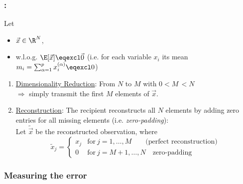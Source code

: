 \begin{frame}\frametitle{\subsecname:~\subsubsecname}

Let
\slidesonly{\vspace{-5mm}}
\begin{itemize}
\item[]$\vec x \in \R^N$,\\
\item[] w.l.o.g. $\E[\vec x] \eqexcl \vec 0$ \notesonly{\\

}(i.e. for each variable $x_i$ its mean $m_i = \sum_{\alpha=1}^{p} x_i^{(\alpha)} \eqexcl 0$)
\end{itemize}

\pause

\begin{enumerate}
\item \underline{Dimensionality Reduction}: From $N$ to $M$ with $0 < M\, < N$\\
$\Rightarrow$ simply transmit the first $M$ elements of $\vec x$. 
\pause
\item \underline{Reconstruction}: The recipient reconstructs all $N$ elements by adding zero entries for all missing elements (i.e. \textit{zero-padding}):\\
Let $\widetilde{\vec{x}}$ be the reconstructed observation, where\\ 
 
 \begin{equation}
 \widetilde{x}_j = \begin{cases} 
      {x}_j & \text{for}~j=1,\ldots,M \qquad \text{(perfect reconstruction)} \\
      0 & \text{for}~j=M+1,\ldots,N \quad \text{zero-padding} 
   \end{cases}
 \end{equation}
\end{enumerate}


\end{frame}

\subsubsection{Measuring the error}\label{sec:objective}

